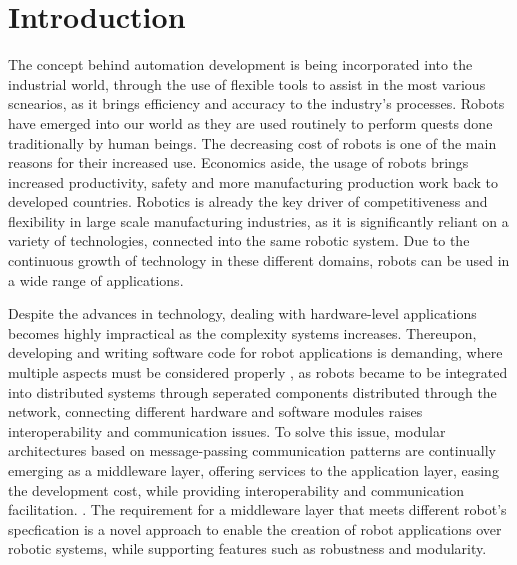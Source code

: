 \chapter{Introduction}\label{c:intro}

The concept behind automation development is being incorporated into the industrial world, through the use of flexible tools to assist in the most various scnearios, as it brings efficiency and accuracy to the industry's processes. Robots have emerged into our world as they are used routinely to perform quests done traditionally by human beings. The decreasing cost of robots is one of the main reasons for their increased use. \cite{craig2005introduction} Economics aside, the usage of robots brings increased productivity, safety and more manufacturing production work back to developed countries. \cite{robots-importance} Robotics is already the key driver of competitiveness and flexibility in large scale manufacturing industries, as it is significantly reliant on a variety of technologies, connected into the same robotic system. Due to the continuous growth of technology in these different domains, robots can be used in a wide range of applications. \cite{mohamed2008middleware}

Despite the advances in technology, dealing with hardware-level applications becomes highly impractical as the complexity systems increases. Thereupon, developing and writing software code for robot applications is demanding, where multiple aspects must be considered properly \cite{intro-ros}, as robots became to be integrated into distributed systems through seperated components distributed through the network, connecting different hardware and software modules raises interoperability and communication issues. To solve this issue, modular architectures based on message-passing communication patterns are continually emerging as a middleware layer, offering services to the application layer, easing the development cost, while providing interoperability and communication facilitation. \cite{mohamed2008middleware, maruyama2016exploring}. The requirement for a middleware layer that meets different robot's specfication is a novel approach to enable the creation of robot applications over robotic systems, while supporting features such as robustness and modularity. 

